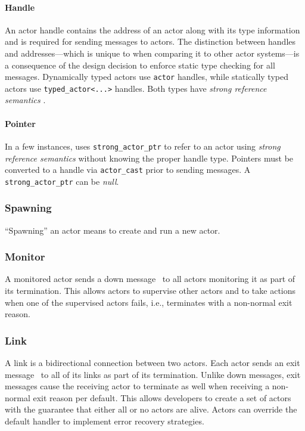 \paragraph{Handle}
\label{actor-handle}

An actor handle contains the address of an actor along with its type
information and is required for sending messages to actors. The distinction
between handles and addresses---which is unique to \lib when comparing it to
other actor systems---is a consequence of the design decision to enforce static
type checking for all messages. Dynamically typed actors use \lstinline^actor^
handles, while statically typed actors use \lstinline^typed_actor<...>^
handles. Both types have \emph{strong reference semantics}
.

\paragraph{Pointer}
\label{actor-pointer}

In a few instances, \lib uses \lstinline^strong_actor_ptr^ to refer to an actor
using \emph{strong reference semantics}  without
knowing the proper handle type. Pointers must be converted to a handle via
\lstinline^actor_cast^  prior to sending messages. A
\lstinline^strong_actor_ptr^ can be \emph{null}.

\subsubsection{Spawning}

``Spawning'' an actor means to create and run a new actor.

\subsubsection{Monitor}
\label{monitor}

A monitored actor sends a down message~ to all actors
monitoring it as part of its termination. This allows actors to supervise other
actors and to take actions when one of the supervised actors fails, i.e.,
terminates with a non-normal exit reason.

\subsubsection{Link}
\label{link}

A link is a bidirectional connection between two actors. Each actor sends an
exit message~ to all of its links as part of its termination.
Unlike down messages, exit messages cause the receiving actor to terminate as
well when receiving a non-normal exit reason per default. This allows
developers to create a set of actors with the guarantee that either all or no
actors are alive. Actors can override the default handler to implement error
recovery strategies.

